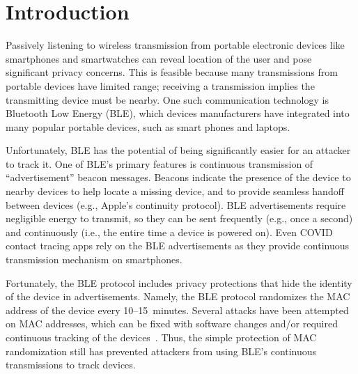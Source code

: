 \section{Introduction}
\label{sec:intro}

Passively listening to wireless transmission from portable electronic devices like  
smartphones and smartwatches can reveal location of the user and pose significant privacy concerns.   
This is feasible because many transmissions from portable devices have limited
range; receiving a transmission implies the transmitting device must be nearby.
One such communication technology is Bluetooth Low Energy
(BLE), which devices manufacturers have integrated into many popular portable devices, 
such as smart phones and laptops.%


Unfortunately, BLE has the potential of being significantly easier for an 
attacker to track it. One of BLE's primary features is continuous transmission 
of ``advertisement'' beacon messages. Beacons indicate the presence of the device 
to nearby devices to help locate a missing
device, and to provide seamless handoff between devices (e.g., Apple's
continuity protocol). BLE advertisements require negligible energy to transmit,
so they can be sent frequently (e.g., once a second) and continuously (i.e.,
the entire time a device is powered on). Even COVID contact tracing apps rely on the BLE
 advertisements as they provide continuous transmission mechanism on smartphones. 



Fortunately, the BLE protocol includes privacy protections that hide the identity of
the device in advertisements. Namely, the BLE protocol randomizes the MAC address of the
device every 10--15~minutes. Several attacks have been attempted on MAC addresses, which
can be fixed with software changes and/or required continuous tracking of the
devices~\cite{Iphonetracking_becker,MACRandomizationfail_Martin}. Thus, the simple protection of MAC randomization 
still has prevented attackers from using BLE's continuous transmissions to track devices. 


